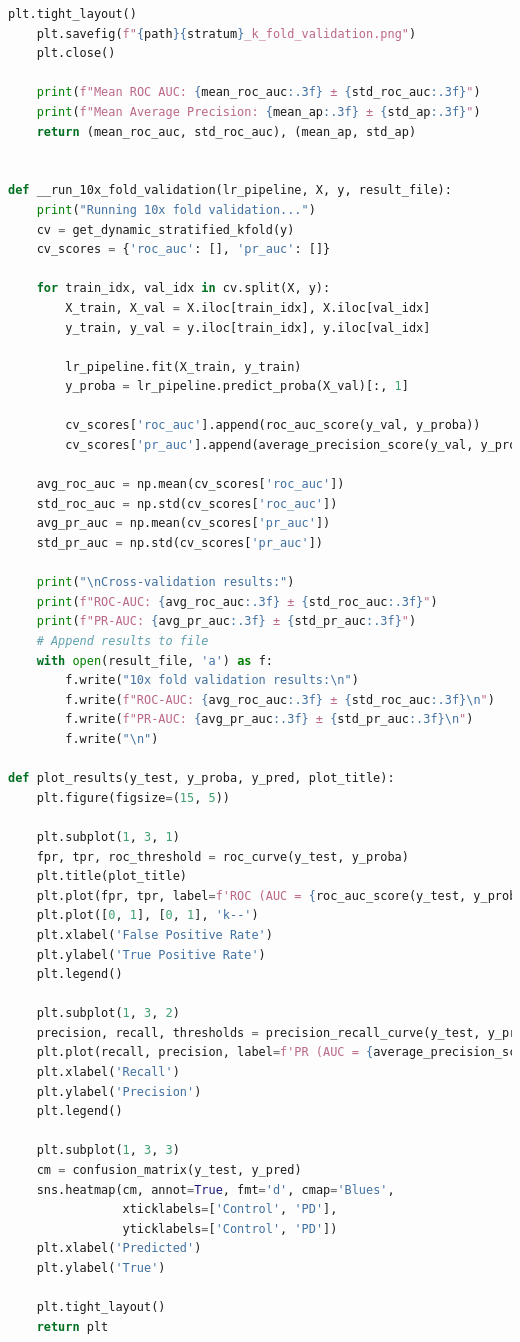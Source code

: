 \documentclass[12pt]{report}
\begin{document}
\begin{lstlisting}[language=Python,caption={common\_ml.py: Κοινές συναρτήσεις για test, cross-validation, κατασκευή plot}, label=lst:commonml]
    plt.tight_layout()
    plt.savefig(f"{path}{stratum}_k_fold_validation.png")
    plt.close()

    print(f"Mean ROC AUC: {mean_roc_auc:.3f} ± {std_roc_auc:.3f}")
    print(f"Mean Average Precision: {mean_ap:.3f} ± {std_ap:.3f}")
    return (mean_roc_auc, std_roc_auc), (mean_ap, std_ap)


def __run_10x_fold_validation(lr_pipeline, X, y, result_file):
    print("Running 10x fold validation...")
    cv = get_dynamic_stratified_kfold(y)
    cv_scores = {'roc_auc': [], 'pr_auc': []}

    for train_idx, val_idx in cv.split(X, y):
        X_train, X_val = X.iloc[train_idx], X.iloc[val_idx]
        y_train, y_val = y.iloc[train_idx], y.iloc[val_idx]

        lr_pipeline.fit(X_train, y_train)
        y_proba = lr_pipeline.predict_proba(X_val)[:, 1]

        cv_scores['roc_auc'].append(roc_auc_score(y_val, y_proba))
        cv_scores['pr_auc'].append(average_precision_score(y_val, y_proba))

    avg_roc_auc = np.mean(cv_scores['roc_auc'])
    std_roc_auc = np.std(cv_scores['roc_auc'])
    avg_pr_auc = np.mean(cv_scores['pr_auc'])
    std_pr_auc = np.std(cv_scores['pr_auc'])

    print("\nCross-validation results:")
    print(f"ROC-AUC: {avg_roc_auc:.3f} ± {std_roc_auc:.3f}")
    print(f"PR-AUC: {avg_pr_auc:.3f} ± {std_pr_auc:.3f}")
    # Append results to file
    with open(result_file, 'a') as f:
        f.write("10x fold validation results:\n")
        f.write(f"ROC-AUC: {avg_roc_auc:.3f} ± {std_roc_auc:.3f}\n")
        f.write(f"PR-AUC: {avg_pr_auc:.3f} ± {std_pr_auc:.3f}\n")
        f.write("\n")

def plot_results(y_test, y_proba, y_pred, plot_title):
    plt.figure(figsize=(15, 5))

    plt.subplot(1, 3, 1)
    fpr, tpr, roc_threshold = roc_curve(y_test, y_proba)
    plt.title(plot_title)
    plt.plot(fpr, tpr, label=f'ROC (AUC = {roc_auc_score(y_test, y_proba):.2f})')
    plt.plot([0, 1], [0, 1], 'k--')
    plt.xlabel('False Positive Rate')
    plt.ylabel('True Positive Rate')
    plt.legend()

    plt.subplot(1, 3, 2)
    precision, recall, thresholds = precision_recall_curve(y_test, y_proba)
    plt.plot(recall, precision, label=f'PR (AUC = {average_precision_score(y_test, y_proba):.2f})')
    plt.xlabel('Recall')
    plt.ylabel('Precision')
    plt.legend()

    plt.subplot(1, 3, 3)
    cm = confusion_matrix(y_test, y_pred)
    sns.heatmap(cm, annot=True, fmt='d', cmap='Blues',
                xticklabels=['Control', 'PD'],
                yticklabels=['Control', 'PD'])
    plt.xlabel('Predicted')
    plt.ylabel('True')

    plt.tight_layout()
    return plt        
    \end{lstlisting}
\end{document}
